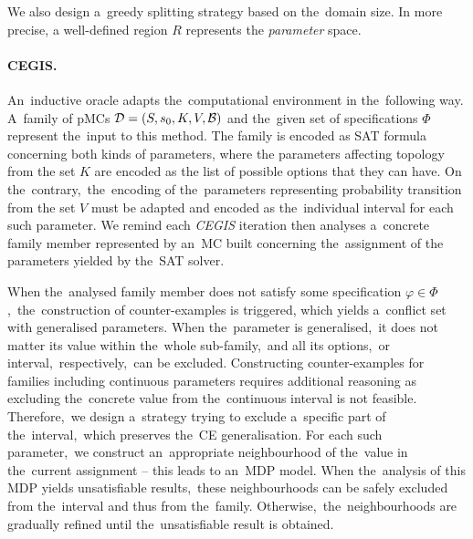 We also design a~greedy splitting strategy based on the~domain size. 
In more precise, a well-defined region $R$ represents the \textit{parameter} space.

\paragraph{CEGIS.}
An~inductive oracle adapts the~computational environment in the~following way.
A~family of pMCs $\mathcal{D} = (S,s_{0},K, V, \mathcal{B})$ and the~given set of specifications $\varPhi$ represent the~input to this method.
The family is encoded as SAT formula concerning both kinds of parameters, where the parameters affecting topology from the set $K$ are encoded as the list of possible options that they can have.
On the~contrary,~the~encoding of the~parameters representing probability transition from the set $V$ must be adapted and encoded as the~individual interval for each such parameter.
We remind each \textit{CEGIS} iteration then analyses a~concrete family member represented by an~MC built concerning the~assignment of the parameters yielded by the~SAT solver.

When the~analysed family member does not satisfy some specification $\varphi \in \varPhi$,~the~construction of counter-examples is triggered, which yields a~conflict set with generalised parameters.
When the~parameter is generalised,~it does not matter its value within the~whole sub-family,~and all its options,~or interval,~respectively,~can be excluded.
Constructing counter-examples for families including continuous parameters requires additional reasoning as excluding the~concrete value from the~continuous interval is not feasible. 
Therefore,~we design a~strategy trying to exclude a~specific part of the~interval,~which preserves the~CE generalisation. 
For each such parameter,~we construct an~appropriate neighbourhood of the~value in the~current assignment -- this leads to an~MDP model.
When the~analysis of this MDP yields unsatisfiable results,~these neighbourhoods can be safely excluded from the~interval and thus from the~family.
Otherwise,~the~neighbourhoods are gradually refined until the~unsatisfiable result is obtained.

